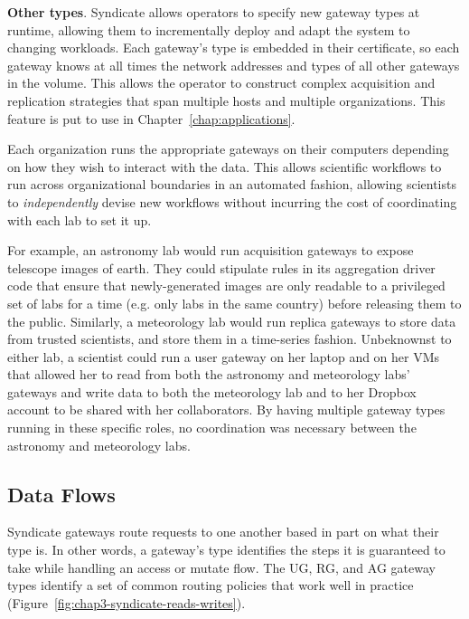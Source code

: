 \textbf{Other types}.  Syndicate allows operators to specify new gateway types at runtime, allowing
them to incrementally deploy and adapt the system to changing workloads.  Each
gateway's type is embedded in their certificate, so each gateway knows at all
times the network addresses and types of all other gateways in the volume.
This allows the operator to construct complex acquisition and replication
strategies that span multiple hosts and multiple organizations.
This feature is put to use in Chapter~\ref{chap:applications}.

Each organization runs the appropriate gateways on their computers depending on
how they wish to interact with the data.  This allows scientific workflows to
run across organizational boundaries in an automated fashion, allowing
scientists to \emph{independently} devise new workflows without incurring the
cost of coordinating with each lab to set it up.

For example, an astronomy lab would
run acquisition gateways to expose telescope images of earth.  They could stipulate rules
in its aggregation driver code that ensure that newly-generated images are only
readable to a privileged set of labs for a time (e.g. only labs in the same
country) before releasing them to the public.  Similarly, a meteorology
lab would run replica gateways to store data from trusted scientists, and
store them in a time-series fashion.  Unbeknownst to either lab, a scientist could
run a user gateway on her laptop and on her VMs that allowed her to read from both the
astronomy and meteorology labs' gateways and write data to both the meteorology
lab and to her Dropbox account to be shared with her collaborators.  By having
multiple gateway types running in these specific roles, no coordination was
necessary between the astronomy and meteorology labs.

\subsection{Data Flows}

Syndicate gateways route requests to one another based in part on what their
type is.  In other words, a gateway's type identifies the steps it is guaranteed
to take while handling an access or mutate flow.
The UG, RG, and AG gateway types identify a set of common routing policies that
work well in practice
(Figure~\ref{fig:chap3-syndicate-reads-writes}).

